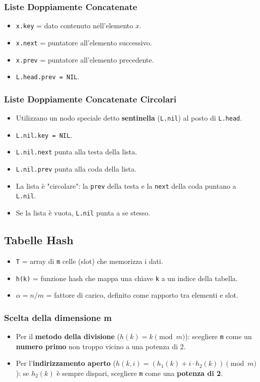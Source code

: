 \subsubsection{Liste Doppiamente Concatenate}
\begin{itemize}
    \item \texttt{x.key} = dato contenuto nell'elemento $x$.
    \item \texttt{x.next} = puntatore all'elemento successivo.
    \item \texttt{x.prev} = puntatore all'elemento precedente.
    \item \texttt{L.head.prev = NIL}.
\end{itemize}

\subsubsection{Liste Doppiamente Concatenate Circolari}
\begin{itemize}
    \item Utilizzano un nodo speciale detto \textbf{sentinella} (\texttt{L.nil}) al posto di \texttt{L.head}.
    \item \texttt{L.nil.key = NIL}.
    \item \texttt{L.nil.next} punta alla testa della lista.
    \item \texttt{L.nil.prev} punta alla coda della lista.
    \item La lista è "circolare": la \texttt{prev} della testa e la \texttt{next} della coda puntano a \texttt{L.nil}.
    \item Se la lista è vuota, \texttt{L.nil} punta a se stesso.
\end{itemize}

\subsection{Tabelle Hash}
\begin{itemize}
    \item \texttt{T} = array di \texttt{m} celle (slot) che memorizza i dati.
    \item \texttt{h(k)} = funzione hash che mappa una chiave \texttt{k} a un indice della tabella.
    \item $\alpha = n/m$ = fattore di carico, definito come rapporto tra elementi e slot.
\end{itemize}

\subsubsection{Scelta della dimensione m}
\begin{itemize}
    \item Per il \textbf{metodo della divisione} ($h(k) = k \pmod{m}$): scegliere \texttt{m} come un \textbf{numero primo} non troppo vicino a una potenza di 2.
    \item Per l'\textbf{indirizzamento aperto} ($h(k, i) = (h_1(k) + i \cdot h_2(k)) \pmod{m}$): se $h_2(k)$ è sempre dispari, scegliere \texttt{m} come una \textbf{potenza di 2}.
\end{itemize}

